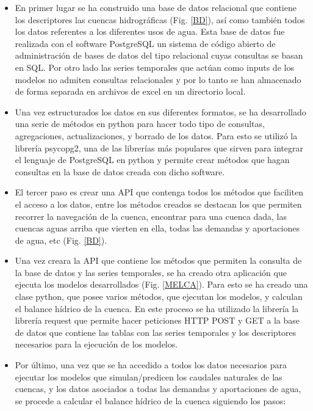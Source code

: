 \begin{itemize}
    \item En primer lugar se ha construido una base de datos relacional que contiene los descriptores las cuencas hidrográficas (Fig. \ref{BD}), así como 
   también todos los datos referentes a los diferentes usos de agua. Esta base de datos fue realizada con el software PostgreSQL  un sistema 
   de código abierto de administración de bases de datos del tipo relacional cuyas consultas  se basan en SQL\cite{PostgretSQL}.
   Por otro lado las series temporales que actúan como inputs de los modelos no admiten consultas relacionales y por lo tanto 
   se han almacenado de forma separada en archivos de excel en un directorio local. 
   \item Una vez estructurados los datos en sus diferentes formatos, se ha desarrollado una serie de métodos en python para hacer todo tipo de consultas,
   agregaciones, actualizaciones, y borrado de los datos. Para esto se utilizó la librería psycopg2, una de las librerías más populares que sirven para 
   integrar el lenguaje de PostgreSQL en python y permite crear métodos que hagan consultas en la base de datos creada con dicho software.
   \item El tercer paso es crear una API que contenga todos los métodos que faciliten el acceso a los datos, entre los métodos creados se destacan 
   los que 
   permiten recorrer la navegación de la cuenca, encontrar para una cuenca dada,  las cuencas aguas arriba que vierten en ella,
    todas las demandas y aportaciones de agua, etc (Fig. \ref{BD}).
    \item Una vez creara la API que contiene los métodos que permiten la consulta de la base de datos y las series temporales, 
    se ha creado otra aplicación que ejecuta los modelos desarrollados (Fig. \ref{MELCA}). Para esto se ha creado una clase python, que posee varios métodos, 
    que ejecutan los modelos, y calculan el balance hídrico de la cuenca. En este proceso se ha utilizado la librería
    la librería request que permite hacer peticiones HTTP POST y GET a la base de datos que contiene las tablas con las series temporales y 
    los descriptores necesarios para la ejecución de los modelos.
    \item Por último, una vez que se ha accedido a todos los datos necesarios para ejecutar los modelos que simulan/predicen los caudales
    naturales de las cuencas, y los datos asociados a todas las demandas y aportaciones de agua, 
    se procede a  calcular el balance hídrico de la cuenca siguiendo los pasos:

\end{itemize}
